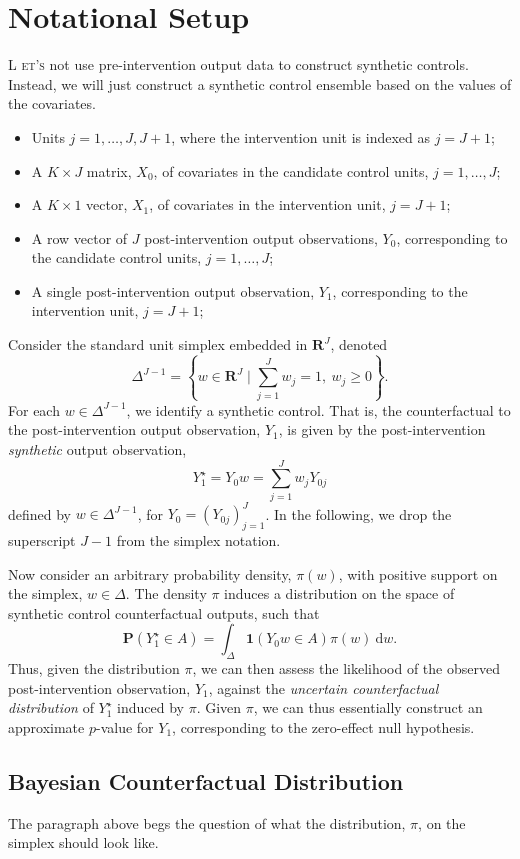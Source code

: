 \documentclass[a4paper, 12pt, onecolumn, singlepage]{article}
\newcommand{\TestLettrine}[2]{\needspace{3\baselineskip} \lettrine[lines=3]{#1}{ #2}}
\begin{document}
\section{Notational Setup}
\TestLettrine{L}{et's}
not use pre-intervention output data to construct synthetic controls.
Instead, we will just construct a synthetic control ensemble based on the values of the covariates.
\begin{itemize}
\item Units $j = 1, \dots, J, J+1$, where the intervention unit is indexed as $j=J+1$;
\item A $K \times J$ matrix, $X_0$, of covariates in the candidate control units, $j=1, \dots, J$;
\item A $K \times 1$ vector, $X_1$, of covariates in the intervention unit, $j=J+1$;
\item A row vector of $J$ post-intervention output observations, $Y_0$, corresponding to the candidate control units, $j=1, \dots, J$;
\item A single post-intervention output observation, $Y_1$, corresponding to the intervention unit, $j=J+1$;
\end{itemize}
Consider the standard unit simplex embedded in $\mathbf R^J$, denoted
\[
\Delta^{J-1} = \left\{ w \in \mathbf R^J \mid \sum_{j=1}^J w_j = 1,~w_j \geq 0 \right\}.
\]
For each $w \in \Delta^{J-1}$, we identify a synthetic control.
That is, the counterfactual to the post-intervention output observation, $Y_1$,
is given by the post-intervention \emph{synthetic} output observation, 
\[
Y_1^\star = Y_0 w = \sum_{j=1}^{J} w_j Y_{0j}
\]
defined by $w \in \Delta^{J-1}$, for $Y_0 = (Y_{0j})_{j=1}^J$.
In the following, we drop the superscript $J-1$ from the simplex notation. 


Now consider an arbitrary probability density, $\pi(w)$,
with positive support on the simplex, $w \in \Delta$.
The density $\pi$ induces a distribution on the space of synthetic control counterfactual outputs,
such that
\[
\mathbf P(Y_1^\star \in A) = \int_\Delta \mathbf 1(Y_0 w \in A) \pi(w) ~\mathrm dw.
\]
Thus, given the distribution $\pi$,
we can then assess the likelihood of the observed post-intervention observation, $Y_1$,
against the \emph{uncertain counterfactual distribution} of $Y_1^\star$ induced by $\pi$.
Given $\pi$, we can thus essentially construct an approximate $p$-value for $Y_1$,
corresponding to the zero-effect null hypothesis.

\subsection{Bayesian Counterfactual Distribution}
The paragraph above begs the question of what the distribution, $\pi$, on the simplex should look like.
\end{document}
